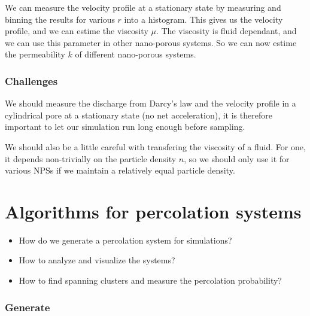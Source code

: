 \documentclass[a4paper, 11pt, notitlepage, english]{article}
\begin{document}
We can measure the velocity profile at a stationary state by measuring and binning the results for various $r$ into a histogram. This gives us the velocity profile, and we can estime the viscosity $\mu$. The viscosity is fluid dependant, and we can use this parameter in other nano-porous systems. So we can now estime the permeability $k$ of different nano-porous systems. 

\subsubsection*{Challenges}

We should measure the discharge from Darcy's law and the velocity profile in a cylindrical pore at a stationary state (no net acceleration), it is therefore important to let our simulation run long enough before sampling.

We should also be a little careful with transfering the viscosity of a fluid. For one, it depends non-trivially on the particle density $n$, so we should only use it for various NPSs if we maintain a relatively equal particle density.

\clearpage



\section{Algorithms for percolation systems}
\begin{itemize}
\item How do we generate a percolation system for simulations? 
\item How to analyze and visualize the systems?
\item How to find spanning clusters and measure the percolation probability?
\end{itemize}

\subsubsection*{Generate}
\end{document}
